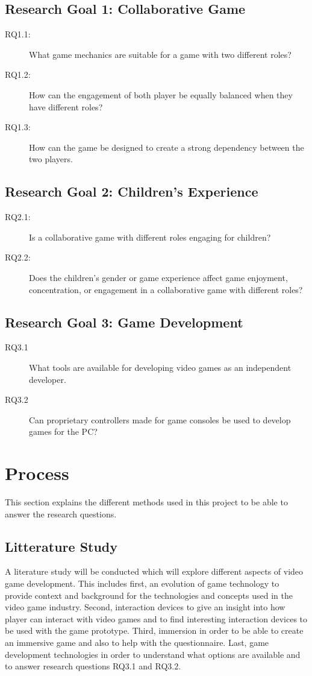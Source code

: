 \subsection{Research Goal 1: Collaborative Game}
\begin{description}
	\item[RQ1.1:] What game mechanics are suitable for a game with two different roles?
	\item[RQ1.2:] How can the engagement of both player be equally balanced when they have different roles?
	\item[RQ1.3:] How can the game be designed to create a strong dependency between the two players.
\end{description}
\subsection{Research Goal 2: Children's Experience}
\begin{description}
	\item[RQ2.1:] Is a collaborative game with different roles engaging for children?
	\item[RQ2.2:] Does the children's gender or game experience affect game enjoyment, concentration, or engagement in a collaborative game with different roles?
\end{description}
\subsection{Research Goal 3: Game Development}
\begin{description}
	\item[RQ3.1] What tools are available for developing video games as an independent developer.
	\item[RQ3.2] Can proprietary controllers made for game consoles be used to develop games for the PC?
\end{description}
	

\section{Process}
This section explains the different methods used in this project to be able to answer the research questions. 

\subsection{Litterature Study}
A literature study will be conducted which will explore different aspects of video game development. This includes first, an evolution of game technology to provide context and background for the technologies and concepts used in the video game industry. Second, interaction devices to give an insight into how player can interact with video games and to find interesting interaction devices to be used with the game prototype. Third, immersion in order to be able to create an immersive game and also to help with the questionnaire. Last, game development technologies in order to understand what options are available and to answer research questions RQ3.1 and RQ3.2.

